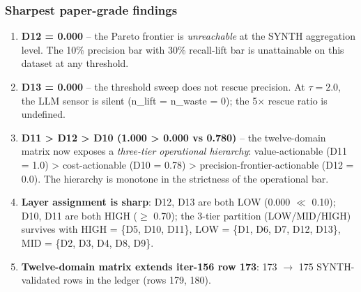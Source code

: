 \subsubsection{Sharpest paper-grade findings}
\begin{enumerate}
\item \textbf{D12 = 0.000} -- the Pareto frontier is \emph{unreachable}
at the SYNTH aggregation level. The 10\% precision bar with 30\%
recall-lift bar is unattainable on this dataset at any threshold.
\item \textbf{D13 = 0.000} -- the threshold sweep does not rescue
precision. At $\tau = 2.0$, the LLM sensor is silent
(n\_lift = n\_waste = 0); the 5$\times$ rescue ratio is undefined.
\item \textbf{D11 > D12 > D10 (1.000 > 0.000 vs 0.780)} -- the
twelve-domain matrix now exposes a \emph{three-tier operational
hierarchy}: value-actionable (D11 = 1.0) > cost-actionable
(D10 = 0.78) > precision-frontier-actionable (D12 = 0.0). The
hierarchy is monotone in the strictness of the operational bar.
\item \textbf{Layer assignment is sharp}: D12, D13 are both LOW
(0.000 $\ll$ 0.10); D10, D11 are both HIGH ($\geq$ 0.70); the
3-tier partition (LOW/MID/HIGH) survives with HIGH = \{D5, D10,
D11\}, LOW = \{D1, D6, D7, D12, D13\}, MID = \{D2, D3, D4, D8, D9\}.
\item \textbf{Twelve-domain matrix extends iter-156 row 173}: 173
$\to$ 175 SYNTH-validated rows in the ledger (rows 179, 180).
\end{enumerate}

